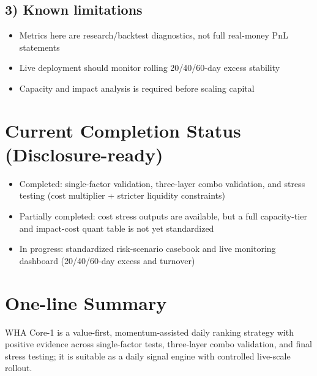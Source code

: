 \documentclass[12pt,a4paper]{article}
\begin{document}
\subsection*{3) Known limitations}
\begin{itemize}
  \item Metrics here are research/backtest diagnostics, not full real-money PnL statements
  \item Live deployment should monitor rolling 20/40/60-day excess stability
  \item Capacity and impact analysis is required before scaling capital
\end{itemize}

\section{Current Completion Status (Disclosure-ready)}
\begin{itemize}
  \item Completed: single-factor validation, three-layer combo validation, and stress testing (cost multiplier + stricter liquidity constraints)
  \item Partially completed: cost stress outputs are available, but a full capacity-tier and impact-cost quant table is not yet standardized
  \item In progress: standardized risk-scenario casebook and live monitoring dashboard (20/40/60-day excess and turnover)
\end{itemize}

\section{One-line Summary}
WHA Core-1 is a value-first, momentum-assisted daily ranking strategy with positive evidence across single-factor tests, three-layer combo validation, and final stress testing; it is suitable as a daily signal engine with controlled live-scale rollout.
\end{document}
